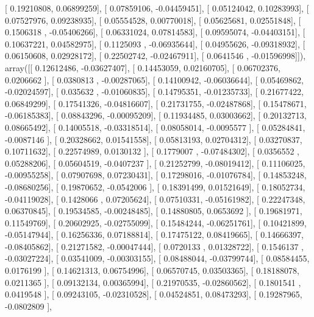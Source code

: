 \documentclass{article}
\begin{document}
       [ 0.19210808,  0.06899259],
       [ 0.07859106, -0.04459451],
       [ 0.05124042,  0.10283993],
       [ 0.07527976,  0.09238935],
       [ 0.05554528,  0.00770018],
       [ 0.05625681,  0.02551848],
       [ 0.1506318 , -0.05406266],
       [ 0.06331024,  0.07814583],
       [ 0.09595074, -0.04403151],
       [ 0.10637221,  0.04582975],
       [ 0.1125093 , -0.06935644],
       [ 0.04955626, -0.09318932],
       [ 0.06150608,  0.02928172],
       [ 0.22502742, -0.02467911],
       [ 0.0641546 , -0.01596998]]), array([[ 0.12612486, -0.03627407],
       [ 0.14453059,  0.02160705],
       [ 0.06702376,  0.0206662 ],
       [ 0.0380813 , -0.00287065],
       [ 0.14100942, -0.06036644],
       [ 0.05469862, -0.02024597],
       [ 0.035632  , -0.01060835],
       [ 0.14795351, -0.01235733],
       [ 0.21677422,  0.06849299],
       [ 0.17541326, -0.04816607],
       [ 0.21731755, -0.02487868],
       [ 0.15478671, -0.06185383],
       [ 0.08843296, -0.00095209],
       [ 0.11934485,  0.03003662],
       [ 0.20132713,  0.08665492],
       [ 0.14005518, -0.03318514],
       [ 0.08058014, -0.0095577 ],
       [ 0.05284841, -0.0087146 ],
       [ 0.20328662,  0.01541558],
       [ 0.05813193,  0.02704312],
       [ 0.03270837,  0.10711632],
       [ 0.22574989,  0.0130132 ],
       [ 0.1779007 , -0.07484302],
       [ 0.0356552 ,  0.05288206],
       [ 0.05604519, -0.0407237 ],
       [ 0.21252799, -0.08019412],
       [ 0.11106025, -0.00955258],
       [ 0.07907698,  0.07230431],
       [ 0.17298016, -0.01076784],
       [ 0.14853248, -0.08680256],
       [ 0.19870652, -0.0542006 ],
       [ 0.18391499,  0.01521649],
       [ 0.18052734, -0.04119028],
       [ 0.1428066 ,  0.07205624],
       [ 0.07510331, -0.05161982],
       [ 0.22247348,  0.06370845],
       [ 0.19534585, -0.00248485],
       [ 0.14880805,  0.0653692 ],
       [ 0.19681971,  0.11549769],
       [ 0.20602925, -0.02755099],
       [ 0.15484244, -0.06251761],
       [ 0.10421899, -0.05147944],
       [ 0.16256336,  0.07188814],
       [ 0.17475122,  0.08419665],
       [ 0.14666397, -0.08405862],
       [ 0.21271582, -0.00047444],
       [ 0.0720133 ,  0.01328722],
       [ 0.1546137 , -0.03027224],
       [ 0.03541009, -0.00303155],
       [ 0.08488044, -0.03799744],
       [ 0.08584455,  0.0176199 ],
       [ 0.14621313,  0.06754996],
       [ 0.06570745,  0.03503365],
       [ 0.18188078,  0.0211365 ],
       [ 0.09132134,  0.00365994],
       [ 0.21970535, -0.02860562],
       [ 0.1801541 ,  0.0419548 ],
       [ 0.09243105, -0.02310528],
       [ 0.04524851,  0.08473293],
       [ 0.19287965, -0.0802809 ],
\end{document}
